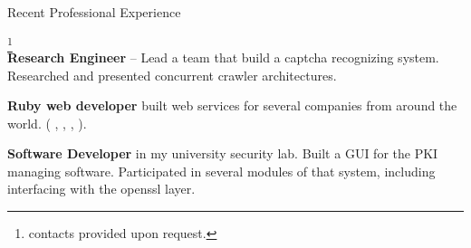 \begin{rubric}{Recent Professional Experience}{
  \footnote{contacts provided upon request.}  \\
  
  \entry*[2010 - Present] \textbf{Research Engineer} -- Lead a team
  that build a captcha recognizing system. Researched and presented
  concurrent crawler architectures.

  \entry*[2007-2009] \textbf{Ruby web developer} built web services
  for several companies from around the world. (
  ,
  ,
  ,
  ).

  \entry*[2005 - 2007] \textbf{Software Developer} in my university
  security lab. Built a GUI for the PKI managing
  software. Participated in several modules of that system, including
  interfacing with the openssl layer.

}\end{rubric}


